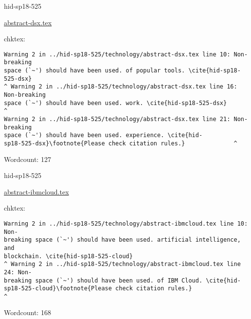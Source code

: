 \begin{IU}

hid-sp18-525

\href{https://github.com/cloudmesh-community/hid-sp18-525/blob/master//technology/abstract-dsx.tex}{abstract-dsx.tex}

 
chktex:
\begin{tiny}
\begin{verbatim}
Warning 2 in ../hid-sp18-525/technology/abstract-dsx.tex line 10: Non-breaking
space (`~') should have been used. of popular tools. \cite{hid-sp18-525-dsx}
^ Warning 2 in ../hid-sp18-525/technology/abstract-dsx.tex line 16: Non-breaking
space (`~') should have been used. work. \cite{hid-sp18-525-dsx}        ^
Warning 2 in ../hid-sp18-525/technology/abstract-dsx.tex line 21: Non-breaking
space (`~') should have been used. experience. \cite{hid-
sp18-525-dsx}\footnote{Please check citation rules.}              ^
\end{verbatim}
\end{tiny}

Wordcount: 127

\end{IU}



\begin{IU}

hid-sp18-525

\href{https://github.com/cloudmesh-community/hid-sp18-525/blob/master//technology/abstract-ibmcloud.tex}{abstract-ibmcloud.tex}

 
chktex:
\begin{tiny}
\begin{verbatim}
Warning 2 in ../hid-sp18-525/technology/abstract-ibmcloud.tex line 10: Non-
breaking space (`~') should have been used. artificial intelligence, and
blockchain. \cite{hid-sp18-525-cloud}
^ Warning 2 in ../hid-sp18-525/technology/abstract-ibmcloud.tex line 24: Non-
breaking space (`~') should have been used. of IBM Cloud. \cite{hid-
sp18-525-cloud}\footnote{Please check citation rules.}                ^
\end{verbatim}
\end{tiny}

Wordcount: 168

\end{IU}



